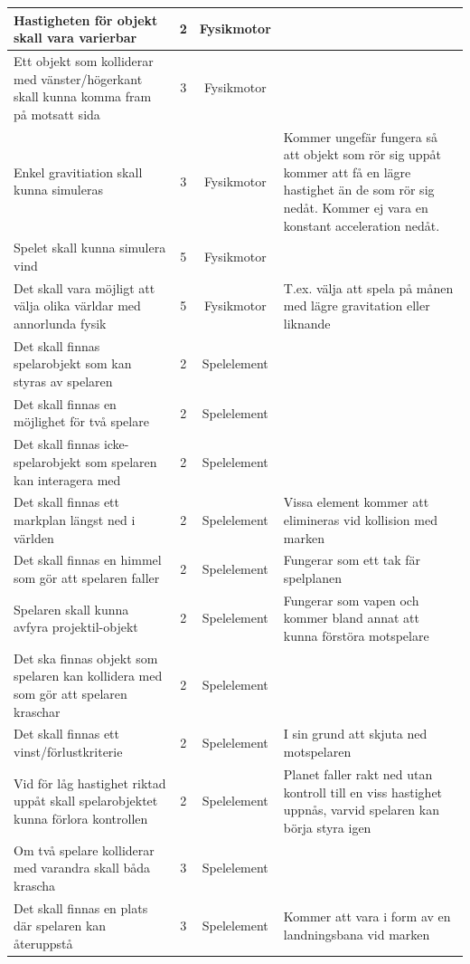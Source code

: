 \documentclass[12pt,a4paper]{article}
\begin{document}
\begin{longtable}{ | p{3.5cm} | c | c | p{3.5cm} | }
	Hastigheten för objekt skall vara varierbar & 2 & Fysikmotor & \\ 
	\hline
	Ett objekt som kolliderar med vänster/högerkant skall kunna komma fram på motsatt sida & 3 & Fysikmotor & \\ \hline
	Enkel gravitiation skall kunna simuleras & 3 & Fysikmotor & Kommer ungefär fungera så att objekt som rör sig uppåt kommer att få en lägre hastighet än de som rör sig nedåt. Kommer ej vara en konstant acceleration nedåt.\\ \hline
	Spelet skall kunna simulera vind  & 5 & Fysikmotor & \\ \hline
	Det skall vara möjligt att välja olika världar med annorlunda fysik & 5 & Fysikmotor & T.ex. välja att spela på månen med lägre gravitation eller liknande\\ \hline
	Det skall finnas spelarobjekt som kan styras av spelaren & 2 & Spelelement & \\ \hline
	Det skall  finnas en möjlighet för två spelare & 2 & Spelelement & \\ \hline
	Det skall finnas icke-spelarobjekt som spelaren kan interagera med & 2 & Spelelement & \\ \hline
	Det skall finnas ett markplan längst ned i världen & 2 & Spelelement & Vissa element kommer att elimineras vid kollision med marken\\ \hline
	Det skall finnas en himmel som gör att spelaren faller & 2 & Spelelement & Fungerar som ett tak fär spelplanen\\ \hline
	Spelaren skall kunna avfyra projektil-objekt  & 2 & Spelelement & Fungerar som vapen och kommer bland annat att kunna förstöra motspelare\\ \hline
	Det ska  finnas objekt som spelaren kan kollidera med som gör att spelaren kraschar & 2 & Spelelement & \\ \hline
	Det skall finnas ett vinst/förlustkriterie & 2 & Spelelement & I sin grund att skjuta ned motspelaren\\ \hline
	Vid för låg hastighet riktad uppåt skall spelarobjektet kunna förlora kontrollen & 2 & Spelelement & Planet faller rakt ned utan kontroll till en viss hastighet uppnås, varvid spelaren kan börja styra igen\\ \hline
	Om två spelare kolliderar med varandra skall båda krascha & 3 & Spelelement & \\ \hline
	Det skall finnas en plats där spelaren kan återuppstå & 3 & Spelelement & Kommer att vara i form av en landningsbana vid marken\\ \hline

\end{longtable}
\end{document}
